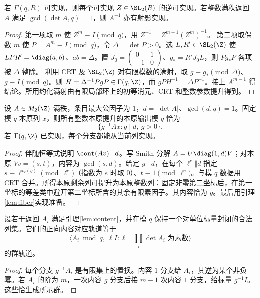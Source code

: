 \begin{lemma}\label{lem:inverse}
若 $\Gamma(q,R)$ 可实现，则每个可实现 $Z\in\SL_2(R)$ 的逆可实现。若整数满秩返回 $A$ 满足 $\gcd(\det A,q)=1$，则 $A^{-1}$ 亦有射影实现。
\end{lemma}
\begin{proof}
第一项取 $m$ 使 $Z^m\equiv I\pmod q$，用 $Z^{-1}=Z^{m-1}(Z^m)^{-1}$。
第二项取偶数 $m$ 使 $P=A^m\equiv I\pmod q$，令 $\Delta=\det P>0$。选 $L,R'\in\SL_2(\Z)$ 使 $LPR'=\diag(a,b)$、$ab=\Delta$。置 $J_0=\left(\begin{smallmatrix}0&1\\-1&0\end{smallmatrix}\right)$、$g_*=R'J_0L$，则 $Pg_*P$ 各项被 $\Delta$ 整除。
利用 CRT 及 $\SL_2(\Z)$ 对有限模数的满射，取 $g\equiv g_*\pmod\Delta$、$g\equiv I\pmod q$。则 $H=\Delta^{-1}PgP\in\Gamma(q,\Z)$，而 $gPH^{-1}=\Delta P^{-1}$。接上 $A^{m-1}$ 得结论。所用约化满射由有限局部环上的初等消元、CRT 和整数参数提升得到。
\end{proof}

\begin{lemma}\label{lem:content}
设 $A\in M_2(\Z)$ 满秩，条目最大公因子为 $1$，$d=|\det A|$、$\gcd(d,q)=1$。固定模 $q$ 本原列 $x$，则所有整数本原提升的本原输出模 $q$ 恰为
\begin{equation}\label{eq:content}
\{g^{-1}Ax:g\mid d,\ g>0\}.
\end{equation}
若 $\Gamma(q,\Z)$ 已实现，每个分支都能从当前列实现。
\end{lemma}
\begin{proof}
伴随恒等式说明 $\cont(Av)\mid d$。写 Smith 分解 $A=U\diag(1,d)V$；对本原 $Vv=(s,t)$，内容为 $\gcd(s,d)$。给定 $g\mid d$，在每个 $\ell^e\Vert d$ 指定 $s\equiv\ell^{v_\ell(g)}\pmod{\ell^e}$（指数为 $e$ 时取 $0$）、$t\equiv1\pmod{\ell^e}$。与模 $q$ 数据用 CRT 合并。所得本原剩余列可提升为本原整数列：固定非零第二坐标后，在第一坐标的等差类中避开第二坐标所含的其余有限素因子。其内容恰为 $g$。最后用引理\ref{lem:fiber}实现准备。
\end{proof}

\begin{corollary}\label{cor:finite-group}
设若干返回 $A_i$ 满足引理\ref{lem:content}，并在模 $q$ 保持一个对单位标量封闭的合法列集。它们的正向内容对应轨道等于
\[
\langle A_i\bmod q,\ \ell I:\ell\mid\prod_i\det A_i\text{ 为素数}\rangle
\]
的群轨道。
\end{corollary}
\begin{proof}
每个分支 $g^{-1}A_i$ 是有限集上的置换。内容 $1$ 分支给 $A_i$，其逆为某个非负幂。若 $A_i$ 的阶为 $m$，一次内容 $g$ 分支后接 $m-1$ 次内容 $1$ 分支，给标量 $g^{-1}I$。这些恰生成所示群。
\end{proof}

